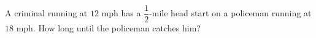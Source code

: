A criminal running at $12$ mph has a $\dfrac12$-mile head start on a policeman running at $18$ mph. How long until the policeman catches him?
